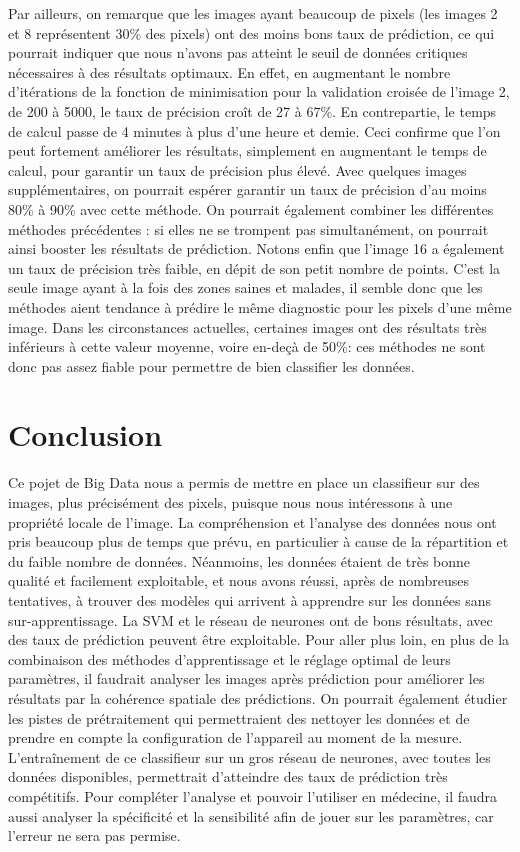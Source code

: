 \documentclass[a4paper,10pt]{report}
\begin{document}
Par ailleurs, on remarque que les images ayant beaucoup de pixels (les images 2 et 8 représentent 30\% des pixels) ont des moins bons taux de prédiction, ce qui pourrait indiquer que nous n'avons pas atteint le seuil de données critiques nécessaires à des résultats optimaux. En effet, en augmentant le nombre d’itérations de la fonction de minimisation pour la validation croisée de l’image 2, de 200 à 5000, le taux de précision croît de 27 à 67\%. En contrepartie, le temps de calcul passe de 4 minutes à plus d’une heure et demie. Ceci confirme que l’on peut fortement améliorer les résultats, simplement en augmentant le temps de calcul, pour garantir un taux de précision plus élevé.
Avec quelques images supplémentaires, on pourrait espérer garantir un taux de précision d'au moins 80\% à 90\% avec cette méthode. On pourrait également combiner les différentes méthodes précédentes : si elles ne se trompent pas simultanément, on pourrait ainsi booster les résultats de prédiction.
Notons enfin que l'image 16 a également un taux de précision très faible, en dépit de son petit nombre de points. C'est la seule image ayant à la fois des zones saines et malades, il semble donc que les méthodes aient tendance à prédire le même diagnostic pour les pixels d'une même image.
Dans les circonstances actuelles, certaines images ont des résultats très inférieurs à cette valeur moyenne, voire en-deçà de 50\%: ces méthodes ne sont donc pas assez fiable pour permettre de bien classifier les données.


\chapter*{Conclusion}
Ce pojet de Big Data nous a permis de mettre en place un classifieur sur des images, plus précisément des pixels, puisque nous nous intéressons à une propriété locale de l'image. La compréhension et l'analyse des données nous ont pris beaucoup plus de temps que prévu, en particulier à cause de la répartition et du faible nombre de données. Néanmoins, les données étaient de très bonne qualité et facilement exploitable, et nous avons réussi, après de nombreuses tentatives, à trouver des modèles qui arrivent à apprendre sur les données sans sur-apprentissage. La SVM et le réseau de neurones ont de bons résultats, avec des taux de prédiction peuvent être exploitable. Pour aller plus loin, en plus de la combinaison des méthodes d’apprentissage et le réglage optimal de leurs paramètres, il faudrait analyser les images après prédiction pour améliorer les résultats par la cohérence spatiale des prédictions. On pourrait également étudier les pistes de prétraitement qui permettraient des nettoyer les données et de prendre en compte la configuration de l'appareil au moment de la mesure. L’entraînement de ce classifieur sur un gros réseau de neurones, avec toutes les données disponibles, permettrait d'atteindre des taux de prédiction très compétitifs. Pour compléter l'analyse et pouvoir l'utiliser en médecine, il faudra aussi analyser la spécificité et la sensibilité afin de jouer sur les paramètres, car l’erreur ne sera pas permise.

\tableofcontents
\listoffigures
\end{document}
